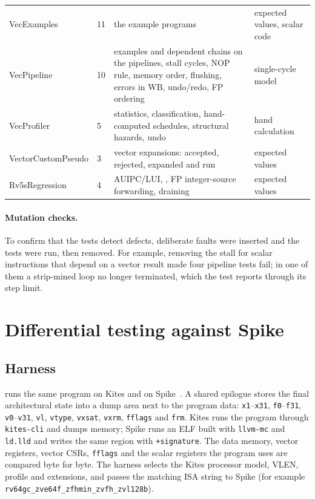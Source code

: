 \documentclass[11pt]{article}
\begin{document}
\begin{longtable}{@{}L{3.4cm}L{1.0cm}L{6.9cm}L{2.7cm}@{}}
VecExamples & 11 & the example programs & expected values, scalar code \\
VecPipeline & 10 & examples and dependent chains on the pipelines, stall cycles, NOP rule, memory order, flushing, errors in WB, undo/redo, FP ordering & single-cycle model \\
VecProfiler & 5 & statistics, classification, hand-computed schedules, structural hazards, undo & hand calculation \\
VectorCustomPseudo & 3 & vector expansions: accepted, rejected, expanded and run & expected values \\
Rv5sRegression & 4 & AUIPC/LUI, , FP integer-source forwarding, draining & expected values \\
\bottomrule
\end{longtable}
\normalsize

\paragraph{Mutation checks.} To confirm that the tests detect defects, deliberate faults were
inserted and the tests were run, then removed. For example, removing the stall for scalar
instructions that depend on a vector result made four pipeline tests fail; in one of them a
strip-mined loop no longer terminated, which the test reports through its step limit.

\section{Differential testing against Spike}\label{sec:spike}

\subsection{Harness}
 runs the same program on Kites and on Spike~\cite{spike}. A
shared epilogue stores the final architectural state into a dump area next to the program data:
\texttt{x1}--\texttt{x31}, \texttt{f0}--\texttt{f31}, \texttt{v0}--\texttt{v31}, \texttt{vl},
\texttt{vtype}, \texttt{vxsat}, \texttt{vxrm}, \texttt{fflags} and \texttt{frm}. Kites runs the
program through \texttt{kites-cli} and dumps memory; Spike runs an ELF built with
\texttt{llvm-mc} and \texttt{ld.lld} and writes the same region with \texttt{+signature}. The data
memory, vector registers, vector CSRs, \texttt{fflags} and the scalar registers the program uses
are compared byte for byte. The harness selects the Kites processor model, VLEN, profile and
extensions, and passes the matching ISA string to Spike (for example
\texttt{rv64gc\_zve64f\_zfhmin\_zvfh\_zvl128b}).
\end{document}
